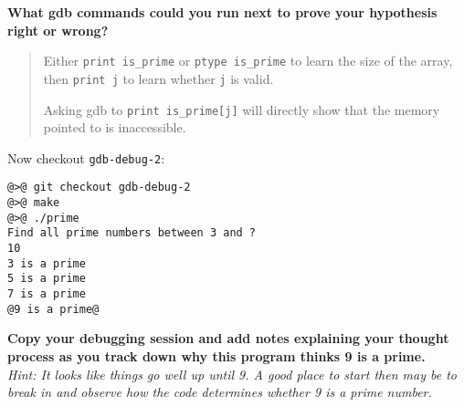 \documentclass{article}
\begin{document}
\textbf{What gdb commands could you run next to prove your hypothesis right or
  wrong?}
\begin{quote}
  \color{violet}
  Either \texttt{print is\_prime} or \texttt{ptype is\_prime} to learn the
  size of the array, then \texttt{print j} to learn whether \texttt{j} is
  valid.

  Asking gdb to \texttt{print is\_prime[j]} will directly show that the memory
  pointed to is inaccessible.
\end{quote}


\newpage
Now checkout \texttt{gdb-debug-2}:
\begin{lstlisting}
@>@ git checkout gdb-debug-2
@>@ make
@>@ ./prime
Find all prime numbers between 3 and ?
10
3 is a prime
5 is a prime
7 is a prime
@9 is a prime@
\end{lstlisting}
\textbf{Copy your debugging session and add notes explaining your
  thought process as you track down why this program thinks 9 is a prime.}\\
\emph{\small Hint: It looks like things go well up until 9. A good place to
  start then may be to break in and observe how the code determines whether 9
  is a prime number.}
\end{document}
